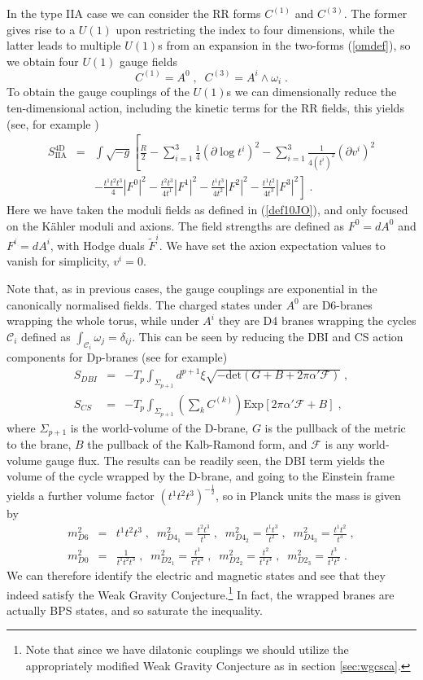 \documentclass[11pt,a4paper]{article}
\numberwithin{equation}{section}
\numberwithin{table}{section}\setlength{\multlinegap}{25pt}
\newcommand{\bea}{\begin{eqnarray}}  \newcommand{\eea}{\end{eqnarray}}
\newcommand{\nn}{\nonumber}
\newcommand{\cC}{\mathcal{C}}
\newcommand{\cF}{\mathcal{F}}
\newcommand{\be}{\begin{equation}}
\newcommand{\ee}{\end{equation}}
\begin{document}
In the type IIA case we can consider the RR forms $C^{(1)}$ and $C^{(3)}$. The former gives rise to a $U(1)$ upon restricting the index to four dimensions, while the latter leads to multiple $U(1)$s from an expansion in the two-forms (\ref{omdef}), so we obtain four $U(1)$ gauge fields
\be
\label{iiaas}
C^{(1)} = A^0  \;,\;\; C^{(3)} = A^i  \wedge \omega_i \;. 
\ee
To obtain the gauge couplings of the $U(1)$s we can dimensionally reduce the ten-dimensional action, including the kinetic terms for the RR fields, this yields (see, for example \cite{Klaewer}) 
\bea
S^{\mathrm{4D}}_{\mathrm{IIA}} &=&  \int \sqrt{-g} \left[ \frac{R}{2} - \sum_{i=1}^3 \frac14 \left(\partial \log t^i \right)^2  - \sum_{i=1}^3 \frac{1}{4\left(t^i\right)^2} \left(\partial v^i\right)^2  \right. \nn \\ 
& & \left. - \frac{t^1 t^2 t^3}{4} \left|F^0\right|^2 - \frac{ t^2 t^3}{4 t^1} \left|F^1\right|^2 - \frac{ t^1 t^3}{4 t^2} \left|F^2\right|^2 - \frac{t^1 t^2}{4 t^3} \left|F^3\right|^2  \right] \;.
\label{actiia4dgauge}
\eea
Here we have taken the moduli fields as defined in (\ref{def10JO}), and only focused on the K{\"a}hler moduli and axions. The field strengths are defined as $F^0 = dA^0$ and $F^i = dA^i$, with Hodge duals $\tilde{F}^i$. We have set the axion expectation values to vanish for simplicity, $v^i=0$. 

Note that, as in previous cases, the gauge couplings are exponential in the canonically normalised fields. The charged states under $A^0$ are D6-branes wrapping the whole torus, while under $A^i$ they are D4 branes wrapping the cycles $\cC_i$ defined as $\int_{\cC_i} \omega_j = \delta_{ij}$. This can be seen by reducing the DBI and CS action components for Dp-branes (see \cite{Johnson:2003gi} for example)
\bea
S_{DBI} &=& -T_p \int_{\Sigma_{p+1}} d^{p+1}\xi \sqrt{-\mathrm{det} \left(G+ B + 2 \pi \alpha'\cF \right)} \;, \nn \\
S_{CS} &=& - T_p \int_{\Sigma_{p+1}} \left(\sum_k C^{(k)} \right) \mathrm{Exp} \left[ 2 \pi \alpha' \cF + B\right]\;, \label{dbranecs}
\eea
where $\Sigma_{p+1}$ is the world-volume of the D-brane, $G$ is the pullback of the metric to the brane, $B$ the pullback of the Kalb-Ramond form, and $\cF$ is any world-volume gauge flux. The results can be readily seen, the DBI term yields the volume of the cycle wrapped by the D-brane, and going to the Einstein frame yields a further volume factor $\left(t^1 t^2 t^3 \right)^{-\frac12}$, so in Planck units the mass is given by 
\bea
m^2_{D6} &=& t^1 t^2 t^3 \;, \;\; m^2_{D4_1} = \frac{t^2 t^3}{t^1}   \;, \;\; m^2_{D4_2} = \frac{t^1 t^3}{t^2} \;, \;\; m^2_{D4_3} = \frac{t^1 t^2}{t^3} \;, \nn \\
m^2_{D0} &=& \frac{1}{t^1 t^2 t^3} \;, \;\; m^2_{D2_1} = \frac{t^1}{t^2 t^3}   \;, \;\; m^2_{D2_2} = \frac{t^2}{t^1 t^3} \;, \;\; m^2_{D2_3} = \frac{t^3}{t^1 t^2} \;. 
\label{iiadmass}
\eea
We can therefore identify the electric and magnetic states and see that they indeed satisfy the Weak Gravity Conjecture.\footnote{Note that since we have dilatonic couplings we should utilize the appropriately modified Weak Gravity Conjecture as in section \ref{sec:wgcsca}.} In fact, the wrapped branes are actually BPS states, and so saturate the inequality. 
\end{document}
